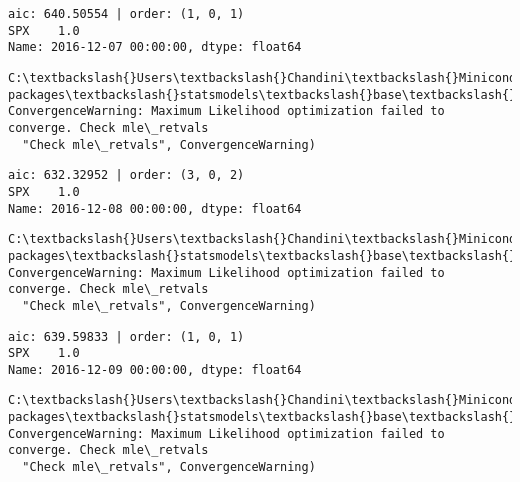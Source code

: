 \documentclass[11pt]{article}
\begin{document}
    \begin{Verbatim}[commandchars=\\\{\}]
aic: 640.50554 | order: (1, 0, 1)
SPX    1.0
Name: 2016-12-07 00:00:00, dtype: float64

    \end{Verbatim}

    \begin{Verbatim}[commandchars=\\\{\}]
C:\textbackslash{}Users\textbackslash{}Chandini\textbackslash{}Miniconda3\textbackslash{}envs\textbackslash{}auquan\textbackslash{}lib\textbackslash{}site-packages\textbackslash{}statsmodels\textbackslash{}base\textbackslash{}model.py:496: ConvergenceWarning: Maximum Likelihood optimization failed to converge. Check mle\_retvals
  "Check mle\_retvals", ConvergenceWarning)

    \end{Verbatim}

    \begin{Verbatim}[commandchars=\\\{\}]
aic: 632.32952 | order: (3, 0, 2)
SPX    1.0
Name: 2016-12-08 00:00:00, dtype: float64

    \end{Verbatim}

    \begin{Verbatim}[commandchars=\\\{\}]
C:\textbackslash{}Users\textbackslash{}Chandini\textbackslash{}Miniconda3\textbackslash{}envs\textbackslash{}auquan\textbackslash{}lib\textbackslash{}site-packages\textbackslash{}statsmodels\textbackslash{}base\textbackslash{}model.py:496: ConvergenceWarning: Maximum Likelihood optimization failed to converge. Check mle\_retvals
  "Check mle\_retvals", ConvergenceWarning)

    \end{Verbatim}

    \begin{Verbatim}[commandchars=\\\{\}]
aic: 639.59833 | order: (1, 0, 1)
SPX    1.0
Name: 2016-12-09 00:00:00, dtype: float64

    \end{Verbatim}

    \begin{Verbatim}[commandchars=\\\{\}]
C:\textbackslash{}Users\textbackslash{}Chandini\textbackslash{}Miniconda3\textbackslash{}envs\textbackslash{}auquan\textbackslash{}lib\textbackslash{}site-packages\textbackslash{}statsmodels\textbackslash{}base\textbackslash{}model.py:496: ConvergenceWarning: Maximum Likelihood optimization failed to converge. Check mle\_retvals
  "Check mle\_retvals", ConvergenceWarning)

    \end{Verbatim}
\end{document}
